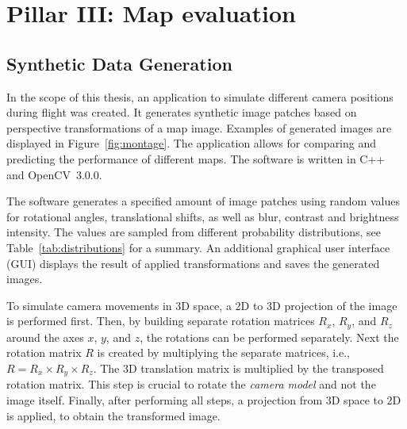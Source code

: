 \documentclass{report}
\begin{document}
\section{Pillar III: Map evaluation}
\label{sec:mapeval}

\subsection{Synthetic Data Generation}
\label{sec:syntheticdatageneration}

In the scope of this thesis, an application to simulate different
camera positions during flight was created. It generates synthetic
image patches based on perspective transformations of a map
image. Examples of generated images are displayed in
Figure~\ref{fig:montage}. The application allows for comparing and
predicting the performance of different maps. The software is written
in C++ and OpenCV~3.0.0.

The software generates a specified amount of image patches using random
values for rotational angles, translational shifts, as well as blur,
contrast and brightness intensity. The values are sampled from
different probability distributions, see Table~\ref{tab:distributions}
for a summary. An additional graphical user interface (GUI) displays
the result of applied transformations and saves the generated images.

To simulate camera movements in 3D space, a 2D to 3D projection of the
image is performed first. Then, by building separate rotation matrices
$R_x$, $R_y$, and $R_z$ around the axes $x$, $y$, and $z$, the
rotations can be performed separately. Next the rotation matrix $R$ is
created by multiplying the separate matrices, i.e.,
$R = R_x \times R_y \times R_z$. The 3D translation matrix is
multiplied by the transposed rotation matrix. This step is crucial to
rotate the \emph{camera model} and not the image itself. Finally,
after performing all steps, a projection from 3D space to 2D is
applied, to obtain the transformed image.
\end{document}
